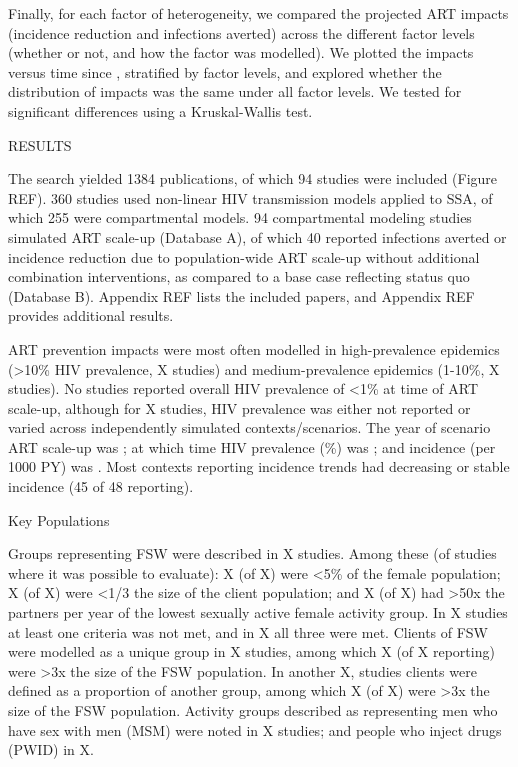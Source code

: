 Finally, for each factor of heterogeneity,
we compared the projected ART impacts (incidence reduction and infections averted)
across the different factor levels (whether or not, and how the factor was modelled).
We plotted the impacts versus time since , stratified by factor levels,
and explored whether the distribution of impacts
was the same under all factor levels.
We tested for significant differences using a Kruskal-Wallis test.

RESULTS

The search yielded 1384 publications,
of which 94 studies were included
(Figure REF).
360 studies used non-linear HIV transmission models applied to SSA, of which
255 were compartmental models. 
94 compartmental modeling studies simulated ART scale-up (Database A), of which
40 reported infections averted or incidence reduction
due to population-wide ART scale-up without additional combination interventions,
as compared to a base case reflecting status quo (Database B).
Appendix REF lists the included papers, and
Appendix REF provides additional results.

ART prevention impacts were most often modelled in
high-prevalence epidemics ({>10\%} HIV prevalence, X studies) and
medium-prevalence epidemics ({1-10\%}, X studies).
No studies reported overall HIV prevalence of {<1\%} at time of ART scale-up,
although for X studies, HIV prevalence was either
not reported or varied across independently simulated contexts/scenarios.
The \xdmdef year of scenario ART scale-up was ; at which time
HIV prevalence (\%) was ; and
incidence (per 1000 PY) was .
Most contexts reporting incidence trends had decreasing or stable incidence
(45 of 48 reporting). 

Key Populations

Groups representing FSW were described in X studies.
Among these (of studies where it was possible to evaluate):
X (of X) were {<5\%} of the female population;
X (of X) were {<1/3} the size of the client population; and
X (of X) had {>50x} the partners per year of
the lowest sexually active female activity group.
In X studies at least one criteria was not met, and
in X all three were met.
Clients of FSW were modelled as a unique group in X studies,
among which X (of X reporting)
were {>3x} the size of the FSW population.
In another X, studies clients were defined as a proportion of another group,
among which X (of X)
were {>3x} the size of the FSW population.
Activity groups described as representing
men who have sex with men (MSM) were noted in X studies; and
people who inject drugs (PWID) in X.

